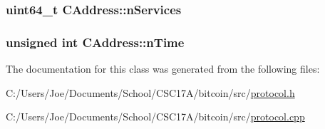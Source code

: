 \subsubsection[{n\+Services}]{\setlength{\rightskip}{0pt plus 5cm}uint64\+\_\+t C\+Address\+::n\+Services}\label{class_c_address_a6a4a6aa020d0d558f238c7d04dd986c3}
\hypertarget{class_c_address_ac1c44aac968b11f90ce529b133ae4e9b}{}
\subsubsection[{n\+Time}]{\setlength{\rightskip}{0pt plus 5cm}unsigned int C\+Address\+::n\+Time}\label{class_c_address_ac1c44aac968b11f90ce529b133ae4e9b}


The documentation for this class was generated from the following files\+:\begin{DoxyCompactItemize}
\item 
C\+:/\+Users/\+Joe/\+Documents/\+School/\+C\+S\+C17\+A/bitcoin/src/\hyperlink{protocol_8h}{protocol.\+h}\item 
C\+:/\+Users/\+Joe/\+Documents/\+School/\+C\+S\+C17\+A/bitcoin/src/\hyperlink{protocol_8cpp}{protocol.\+cpp}\end{DoxyCompactItemize}
